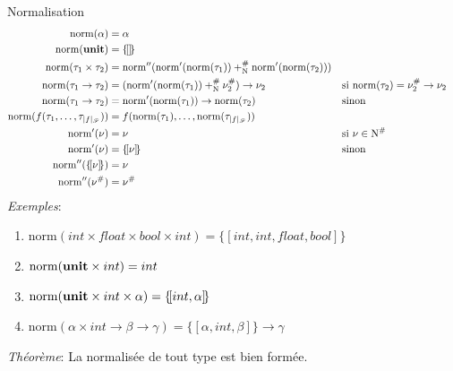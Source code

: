 \documentclass[serif]{beamer}
\newcommand{\exemples}{\textit{Exemples}\xspace}
\newcommand{\theoreme}{\textit{Théorème}\xspace}
\newcommand{\mset}[1]{\{\![#1]\!\}}
\newcommand{\unit}{\bold{unit}}
\newcommand{\norm}{\mathrm{norm}}
\newcommand{\F}{\mathscr{F}}
\newcommand{\N}{\mathrm{N}}
\begin{document}
\begin{frame}{Normalisation}
\tiny
\begin{align*}
		\norm (\alpha) &=
		\alpha
	\\
		\norm (\unit) &=
		\mset{}
	\\
		\norm (\tau_1 \times \tau_2) &=
		\norm'' (\norm' (\norm (\tau_1)) +^\#_\N \norm' (\norm (\tau_2)))
	\\
		\norm (\tau_1 \rightarrow \tau_2) &=
		(\norm' (\norm (\tau_1)) +^\#_\N \nu^\#_2) \rightarrow \nu_2 &&
		\text{si } \norm (\tau_2) = \nu^\#_2 \rightarrow \nu_2
	\\
		\norm (\tau_1 \rightarrow \tau_2) &=
		\norm' (\norm (\tau_1)) \rightarrow \norm (\tau_2) &&
		\text{sinon}
	\\
		\norm (f (\tau_1, \dots, \tau_{|f|_\F})) &=
		f (\norm (\tau_1), \dots, \norm (\tau_{|f|_\F}))
	\\
		\norm' (\nu) &=
		\nu &&
		\text{si } \nu \in \N^\#
	\\
		\norm' (\nu) &=
		\mset{\nu} &&
		\text{sinon}
	\\
		\norm'' (\mset{\nu}) &=
		\nu
	\\
		\norm'' (\nu^\#) &=
		\nu^\#
\end{align*}
\exemples :
\begin{enumerate}
	\item $\norm (int \times float \times bool \times int) = \mset{int, int, float, bool}$
	\item $\norm (\unit \times int) = int$
	\item $\norm (\unit \times int \times \alpha) = \mset{int, \alpha}$
	\item $\norm (\alpha \times int \rightarrow \beta \rightarrow \gamma) = \mset{\alpha, int, \beta} \rightarrow \gamma$
\end{enumerate}
\bigskip
\theoreme :
La normalisée de tout type est bien formée.
\end{frame}

\end{document}

